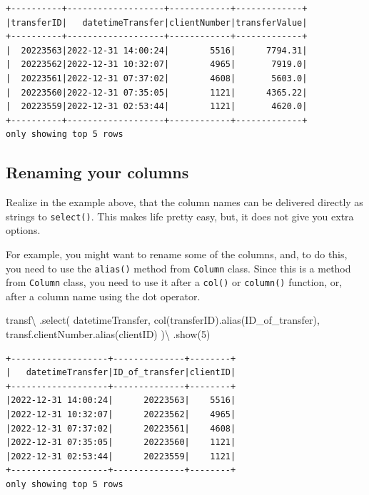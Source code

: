 \documentclass[
  11pt,
  letterpaper,
  DIV=11,
  numbers=noendperiod]{scrreprt}
\newenvironment{Shaded}{\begin{snugshade}}{\end{snugshade}}
\newcommand{\DecValTok}[1]{\textcolor[rgb]{0.68,0.00,0.00}{#1}}
\newcommand{\NormalTok}[1]{\textcolor[rgb]{0.00,0.23,0.31}{#1}}
\newcommand{\OperatorTok}[1]{\textcolor[rgb]{0.37,0.37,0.37}{#1}}
\newcommand{\StringTok}[1]{\textcolor[rgb]{0.13,0.47,0.30}{#1}}
\begin{document}
\begin{verbatim}
+----------+-------------------+------------+-------------+
|transferID|   datetimeTransfer|clientNumber|transferValue|
+----------+-------------------+------------+-------------+
|  20223563|2022-12-31 14:00:24|        5516|      7794.31|
|  20223562|2022-12-31 10:32:07|        4965|       7919.0|
|  20223561|2022-12-31 07:37:02|        4608|       5603.0|
|  20223560|2022-12-31 07:35:05|        1121|      4365.22|
|  20223559|2022-12-31 02:53:44|        1121|       4620.0|
+----------+-------------------+------------+-------------+
only showing top 5 rows
\end{verbatim}

\hypertarget{renaming-your-columns}{%
\subsection{Renaming your columns}\label{renaming-your-columns}}

Realize in the example above, that the column names can be delivered
directly as strings to \texttt{select()}. This makes life pretty easy,
but, it does not give you extra options.

For example, you might want to rename some of the columns, and, to do
this, you need to use the \texttt{alias()} method from \texttt{Column}
class. Since this is a method from \texttt{Column} class, you need to
use it after a \texttt{col()} or \texttt{column()} function, or, after a
column name using the dot operator.

\begin{Shaded}
\begin{Highlighting}[]
\NormalTok{transf}\OperatorTok{\textbackslash{}}
\NormalTok{  .select(}
    \StringTok{\textquotesingle{}datetimeTransfer\textquotesingle{}}\NormalTok{,}
\NormalTok{    col(}\StringTok{\textquotesingle{}transferID\textquotesingle{}}\NormalTok{).alias(}\StringTok{\textquotesingle{}ID\_of\_transfer\textquotesingle{}}\NormalTok{),}
\NormalTok{    transf.clientNumber.alias(}\StringTok{\textquotesingle{}clientID\textquotesingle{}}\NormalTok{)}
\NormalTok{  )}\OperatorTok{\textbackslash{}}
\NormalTok{  .show(}\DecValTok{5}\NormalTok{)}
\end{Highlighting}
\end{Shaded}

\begin{verbatim}
+-------------------+--------------+--------+
|   datetimeTransfer|ID_of_transfer|clientID|
+-------------------+--------------+--------+
|2022-12-31 14:00:24|      20223563|    5516|
|2022-12-31 10:32:07|      20223562|    4965|
|2022-12-31 07:37:02|      20223561|    4608|
|2022-12-31 07:35:05|      20223560|    1121|
|2022-12-31 02:53:44|      20223559|    1121|
+-------------------+--------------+--------+
only showing top 5 rows
\end{verbatim}
\end{document}
